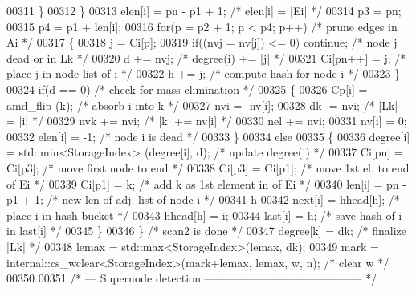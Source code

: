 \begin{DoxyCode}
00311         \}
00312       \}
00313       elen[i] = pn - p1 + 1;        \textcolor{comment}{/* elen[i] = |Ei| */}
00314       p3 = pn;
00315       p4 = p1 + len[i];
00316       \textcolor{keywordflow}{for}(p = p2 + 1; p < p4; p++) \textcolor{comment}{/* prune edges in Ai */}
00317       \{
00318         j = Ci[p];
00319         \textcolor{keywordflow}{if}((nvj = nv[j]) <= 0) \textcolor{keywordflow}{continue}; \textcolor{comment}{/* node j dead or in Lk */}
00320         d += nvj;                  \textcolor{comment}{/* degree(i) += |j| */}
00321         Ci[pn++] = j;             \textcolor{comment}{/* place j in node list of i */}
00322         h += j;                    \textcolor{comment}{/* compute hash for node i */}
00323       \}
00324       \textcolor{keywordflow}{if}(d == 0)                     \textcolor{comment}{/* check for mass elimination */}
00325       \{
00326         Cp[i] = amd\_flip (k);      \textcolor{comment}{/* absorb i into k */}
00327         nvi = -nv[i];
00328         dk -= nvi;                 \textcolor{comment}{/* |Lk| -= |i| */}
00329         nvk += nvi;                \textcolor{comment}{/* |k| += nv[i] */}
00330         nel += nvi;
00331         nv[i] = 0;
00332         elen[i] = -1;             \textcolor{comment}{/* node i is dead */}
00333       \}
00334       \textcolor{keywordflow}{else}
00335       \{
00336         degree[i] = std::min<StorageIndex> (degree[i], d);   \textcolor{comment}{/* update degree(i) */}
00337         Ci[pn] = Ci[p3];         \textcolor{comment}{/* move first node to end */}
00338         Ci[p3] = Ci[p1];         \textcolor{comment}{/* move 1st el. to end of Ei */}
00339         Ci[p1] = k;               \textcolor{comment}{/* add k as 1st element in of Ei */}
00340         len[i] = pn - p1 + 1;     \textcolor{comment}{/* new len of adj. list of node i */}
00341         h %
00342         next[i] = hhead[h];      \textcolor{comment}{/* place i in hash bucket */}
00343         hhead[h] = i;
00344         last[i] = h;      \textcolor{comment}{/* save hash of i in last[i] */}
00345       \}
00346     \}                                   \textcolor{comment}{/* scan2 is done */}
00347     degree[k] = dk;                   \textcolor{comment}{/* finalize |Lk| */}
00348     lemax = std::max<StorageIndex>(lemax, dk);
00349     mark = internal::cs\_wclear<StorageIndex>(mark+lemax, lemax, w, n);    \textcolor{comment}{/* clear w */}
00350     
00351     \textcolor{comment}{/* --- Supernode detection ------------------------------------------ */}

\end{DoxyCode}
